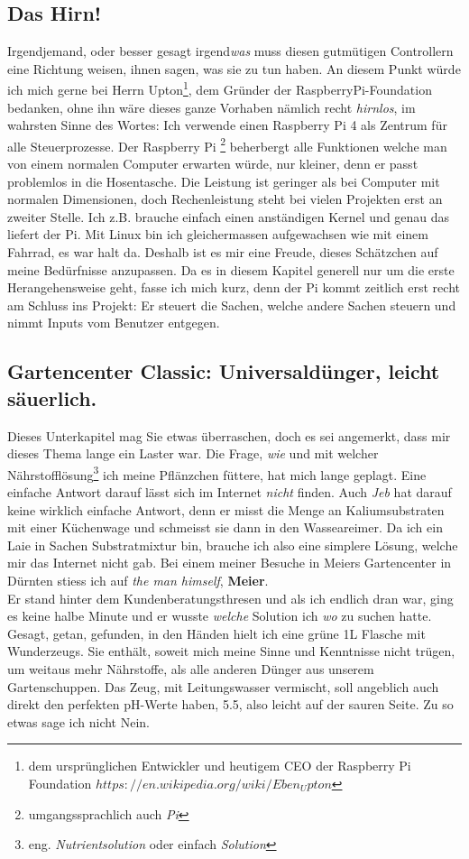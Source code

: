 \documentclass[12pt,titlepage,a4paper]{article}
\begin{document}
\subsection{Das Hirn!}
Irgendjemand, oder besser gesagt irgend\textit{was} muss diesen gutmütigen Controllern eine Richtung weisen, ihnen sagen, was sie zu tun haben. An diesem Punkt würde ich mich gerne bei Herrn Upton\footnote{dem ursprünglichen Entwickler und heutigem CEO der Raspberry Pi Foundation $https://en.wikipedia.org/wiki/Eben_Upton$}, dem Gründer der RaspberryPi-Foundation bedanken, ohne ihn wäre dieses ganze Vorhaben nämlich recht \textit{hirnlos}, im wahrsten Sinne des Wortes: Ich verwende einen Raspberry Pi 4 als Zentrum für alle Steuerprozesse. Der Raspberry Pi \footnote{umgangssprachlich auch \textit{Pi}} beherbergt alle Funktionen welche man von einem normalen Computer erwarten würde, nur kleiner, denn er passt problemlos in die Hosentasche. Die Leistung ist geringer als bei Computer mit normalen Dimensionen, doch Rechenleistung steht bei vielen Projekten erst an zweiter Stelle. Ich z.B. brauche einfach einen anständigen Kernel und genau das liefert der Pi. Mit Linux bin ich gleichermassen aufgewachsen wie mit einem Fahrrad, es war halt da. Deshalb ist es mir eine Freude, dieses Schätzchen auf meine Bedürfnisse anzupassen. Da es in diesem Kapitel generell nur um die erste Herangehensweise geht, fasse ich mich kurz, denn der Pi kommt zeitlich erst recht am Schluss ins Projekt: Er steuert die Sachen, welche andere Sachen steuern und nimmt Inputs vom Benutzer entgegen.

\subsection{Gartencenter Classic: Universaldünger, leicht säuerlich.}
Dieses Unterkapitel mag Sie etwas überraschen, doch es sei angemerkt, dass mir dieses Thema lange ein Laster war. Die Frage, \textit{wie} und mit welcher Nährstofflösung\footnote{eng. \textit{Nutrientsolution} oder einfach \textit{Solution}} ich meine Pflänzchen füttere, hat mich lange geplagt. Eine einfache Antwort darauf lässt sich im Internet \textit{nicht} finden. Auch \textit{Jeb} hat darauf keine wirklich einfache Antwort, denn er misst die Menge an Kaliumsubstraten mit einer Küchenwage und schmeisst sie dann in den Wasseareimer. Da ich ein Laie in Sachen Substratmixtur bin, brauche ich also eine simplere Lösung, welche mir das Internet nicht gab. Bei einem meiner Besuche in Meiers Gartencenter in Dürnten stiess ich auf \textit{the man himself}, \textbf{Meier}. \\ Er stand hinter dem Kundenberatungsthresen und als ich endlich dran war, ging es keine halbe Minute und er wusste \textit{welche} Solution ich \textit{wo} zu suchen hatte. Gesagt, getan, gefunden, in den Händen hielt ich eine grüne 1L Flasche mit Wunderzeugs. Sie enthält, soweit mich meine Sinne und Kenntnisse nicht trügen, um weitaus mehr Nährstoffe, als alle anderen Dünger aus unserem Gartenschuppen. Das Zeug, mit Leitungswasser vermischt, soll angeblich auch direkt den perfekten pH-Werte haben, 5.5, also leicht auf der sauren Seite. Zu so etwas sage ich nicht Nein. 
\end{document}
